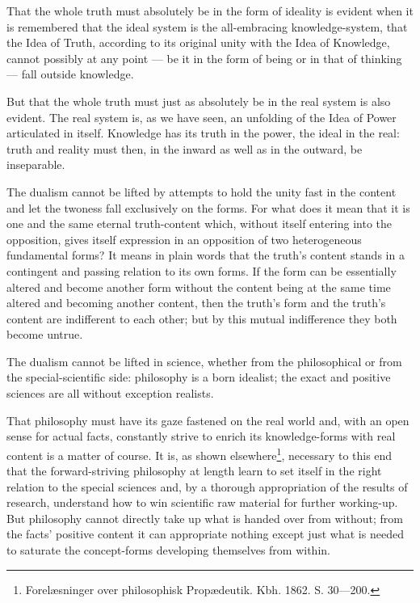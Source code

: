 \documentclass[12pt]{book}
\begin{document}
That the whole truth must absolutely be in the form of ideality is
evident when it is remembered that the ideal system is the
all-embracing knowledge-system, that the Idea of Truth, according to
its original unity with the Idea of Knowledge, cannot possibly at
any point --- be it in the form of being or in that of thinking ---
fall outside knowledge.

But that the whole truth must just as absolutely be in the real
system is also evident. The real system is, as we have seen, an
unfolding of the Idea of Power articulated in itself. Knowledge has
its truth in the power, the ideal in the real: truth and reality
must then, in the inward as well as in the outward, be inseparable.

The dualism cannot be lifted by attempts to hold the unity fast in
the content and let the twoness fall exclusively on the forms. For
what does it mean that it is one and the same eternal truth-content
which, without itself entering into the opposition, gives itself
expression in an opposition of two heterogeneous fundamental forms?
It means in plain words that the truth's content stands in a
contingent and passing
relation to its own forms. If the form can be essentially altered
and become another form without the content being at the same time
altered and becoming another content, then the truth's form and the
truth's content are indifferent to each other; but by this mutual
indifference they both become untrue.

The dualism cannot be lifted in science, whether from the
philosophical or from the special-scientific side: philosophy is a
born idealist; the exact and positive sciences are all without
exception realists.

That philosophy must have its gaze fastened on the real world and,
with an open sense for actual facts, constantly strive to enrich its
knowledge-forms with real content is a matter of course. It is, as
shown elsewhere\footnote{Forelæsninger over philosophisk
Propædeutik. Kbh. 1862. S. 30---200.}, necessary to this end that
the forward-striving philosophy at length learn to set itself in the
right relation to the special sciences and, by a thorough
appropriation of the results of research, understand how to win
scientific raw material for further working-up. But philosophy
cannot directly take up what is handed over from without; from the
facts' positive content it can appropriate nothing except just what
is needed to saturate the concept-forms developing themselves from
within.
\end{document}
